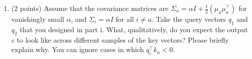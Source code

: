 \begin{enumerate}[(a)]
\begin{enumerate}[label=\roman*.]
    \begin{answer}
    \end{answer}

    \item (2 points) Assume that the covariance matrices are $\Sigma_a=\alpha I + \frac{1}{2}(\mu_a\mu_a^\top)$ for vanishingly small $\alpha$, and $\Sigma_i=\alpha I$  for all $i \neq a$.
    Take the query vectors $q_1$ and $q_2$ that you designed in part i.
    What, qualitatively, do you expect the output $c$ to look like across different samples of the key vectors? Please briefly explain why. You can ignore cases in which $q_i^\top k_a < 0$.

    \begin{answer}
    \end{answer}

    \end{enumerate}

\end{enumerate}